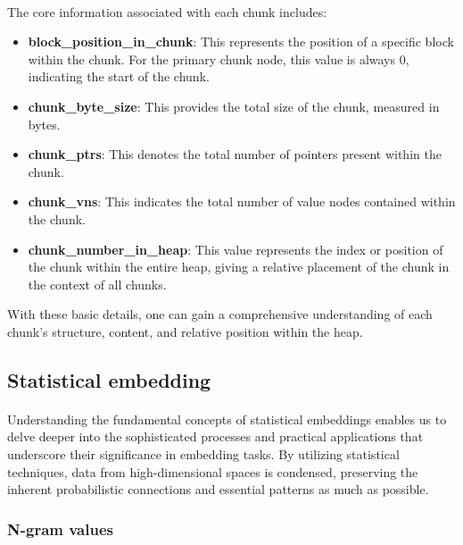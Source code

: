     \paragraph{}The core information associated with each chunk includes:

    \begin{itemize}
        \item \textbf{block\_position\_in\_chunk}: This represents the position of a specific block within the chunk. For the primary chunk node, this value is always 0, indicating the start of the chunk.
        
        \item \textbf{chunk\_byte\_size}: This provides the total size of the chunk, measured in bytes.
        
        \item \textbf{chunk\_ptrs}: This denotes the total number of pointers present within the chunk.
        
        \item \textbf{chunk\_vns}: This indicates the total number of value nodes contained within the chunk.
        
        \item \textbf{chunk\_number\_in\_heap}: This value represents the index or position of the chunk within the entire heap, giving a relative placement of the chunk in the context of all chunks.
    \end{itemize}

    With these basic details, one can gain a comprehensive understanding of each chunk's structure, content, and relative position within the heap.

\subsection{Statistical embedding}
    \paragraph{}Understanding the fundamental concepts of statistical embeddings enables us to delve deeper into the sophisticated processes and practical applications that underscore their significance in embedding tasks. By utilizing statistical techniques, data from high-dimensional spaces is condensed, preserving the inherent probabilistic connections and essential patterns as much as possible.

    \subsubsection{N-gram values}
